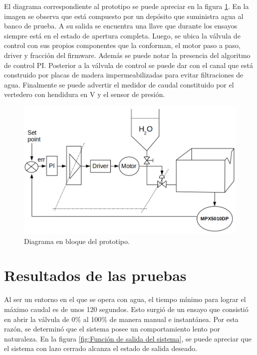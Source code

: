 El diagrama correspondiente al prototipo se puede apreciar en la figura \ref{fig:Diagrama en bloque del prototipo}. En la imagen se observa que está compuesto por un depósito que suministra agua al banco de prueba. A su salida se encuentra una llave que durante los ensayos siempre está en el estado de apertura completa. Luego, se ubica la válvula de control con sus propios componentes que la conforman, el motor paso a paso, driver y fracción del firmware. Además se puede notar la presencia del algoritmo de control PI. Posterior a la válvula de control se puede dar con el canal que está construido por placas de madera impermeabilizadas para evitar filtraciones de agua. Finalmente se puede advertir el medidor de caudal constituido por el vertedero  con hendidura en V y el sensor de presión.
\begin{figure}[h]
	\centering
	\includegraphics[scale=.55]{./Figures/Diagrama-prototipoII.png}
	\caption{Diagrama en bloque del prototipo.}
	\label{fig:Diagrama en bloque del prototipo}
\end{figure}	

\section{Resultados de las pruebas}
\label{sec:Resultados de las pruebas}
Al ser un entorno en el que se opera con agua, el tiempo mínimo para lograr el máximo caudal es de unos 120 segundos. Esto surgió de un ensayo que consistió en abrir la válvula de 0\% al 100\% de manera manual e instantánea. Por esta razón, se determinó que el sistema posee un comportamiento lento por naturaleza. 
En la figura \ref{fig:Función de salida del sistema}, se puede apreciar que el sistema con lazo cerrado alcanza el estado de salida deseado. 

